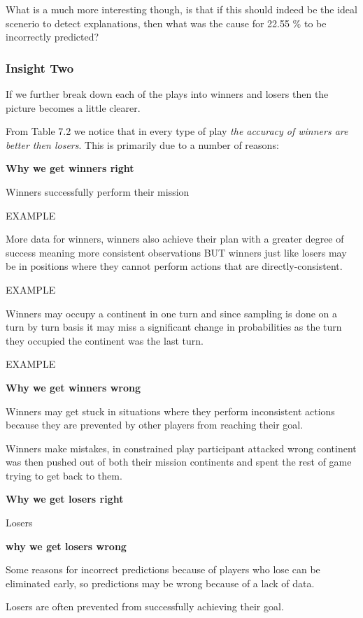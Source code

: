 \documentclass[parskip]{cs4rep}
\begin{document}
What is a much more interesting though, is that if this should indeed be the ideal scenerio to detect explanations, then what was the cause for 22.55 \% to be incorrectly predicted?

\subsubsection{Insight Two}

If we further break down each of the plays into winners and losers then the picture becomes a little clearer.

From Table 7.2 we notice that in every type of play \textit{the accuracy of winners are better then losers}. This is primarily due to a number of reasons:

\textbf{Why we get winners right}

Winners successfully perform their mission

EXAMPLE

More data for winners, winners also achieve their plan with a greater degree of success meaning more consistent observations BUT winners just like losers may be in positions where they cannot perform actions that are directly-consistent.

EXAMPLE

Winners may occupy a continent in one turn and since sampling is done on a turn by turn basis it may miss a significant change in probabilities as the turn they occupied the continent was the last turn.

EXAMPLE

\textbf{Why we get winners wrong}

Winners may get stuck in situations where they perform inconsistent actions because they are prevented by other players from reaching their goal.

Winners make mistakes, in constrained play participant attacked wrong continent was then pushed out of both their mission continents and spent the rest of game trying to get back to them.

\textbf{Why we get losers right}

Losers 

\textbf{why we get losers wrong}

Some reasons for incorrect predictions because of players who lose can be eliminated early, so predictions may be wrong because of a lack of data.

Losers are often prevented from successfully achieving their goal.
\end{document}
